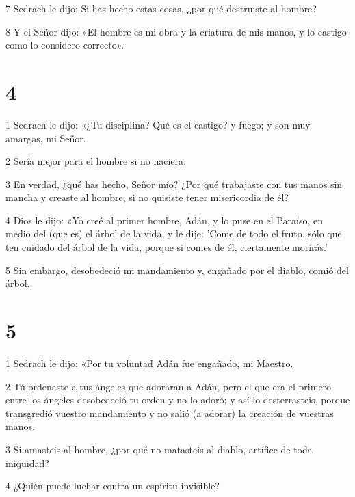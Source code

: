 \par 7 Sedrach le dijo: Si has hecho estas cosas, ¿por qué destruiste al hombre?

\par 8 Y el Señor dijo: «El hombre es mi obra y la criatura de mis manos, y lo castigo como lo considero correcto».

\chapter{4}

\par 1 Sedrach le dijo: «¿Tu disciplina? Qué es el castigo? y fuego; y son muy amargas, mi Señor.

\par 2 Sería mejor para el hombre si no naciera.

\par 3 En verdad, ¿qué has hecho, Señor mío? ¿Por qué trabajaste con tus manos sin mancha y creaste al hombre, si no quisiste tener misericordia de él?

\par 4 Dios le dijo: «Yo creé al primer hombre, Adán, y lo puse en el Paraíso, en medio del (que es) el árbol de la vida, y le dije: 'Come de todo el fruto, sólo que ten cuidado del árbol de la vida, porque si comes de él, ciertamente morirás.'

\par 5 Sin embargo, desobedeció mi mandamiento y, engañado por el diablo, comió del árbol.

\chapter{5}

\par 1 Sedrach le dijo: «Por tu voluntad Adán fue engañado, mi Maestro.

\par 2 Tú ordenaste a tus ángeles que adoraran a Adán, pero el que era el primero entre los ángeles desobedeció tu orden y no lo adoró; y así lo desterrasteis, porque transgredió vuestro mandamiento y no salió (a adorar) la creación de vuestras manos.

\par 3 Si amasteis al hombre, ¿por qué no matasteis al diablo, artífice de toda iniquidad?

\par 4 ¿Quién puede luchar contra un espíritu invisible?

